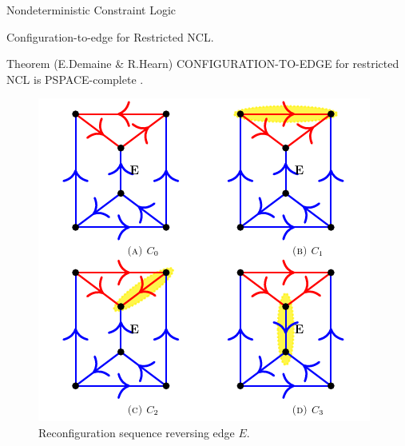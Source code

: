\begin{frame}{Nondeterministic Constraint Logic}
\begin{block}{Configuration-to-edge for Restricted NCL.}
    \begin{block}{Theorem (E.Demaine \& R.Hearn)}
    CONFIGURATION-TO-EDGE for restricted NCL is PSPACE-complete \cite{hearn_demaine_ncl_book}.
    \end{block}
        \begin{figure}
                \centering
                \includegraphics[scale=0.33]{img/restricted_ncl.png}
                \caption{Reconﬁguration sequence reversing edge $E$.}
                \label{fig:ps}
        \end{figure}
    \end{block}

\end{frame}
